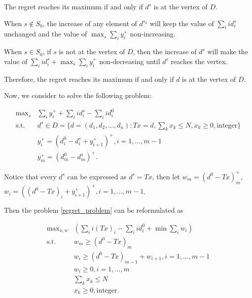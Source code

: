 \begin{thm}
  The regret reaches its maximum if and only if $d^{s}$ is at the vertex of $D$.
\end{thm}

When $s \notin S_0$, the increase of any element of $d^{s_0}$ will keep the value of $\sum_{i} i d^{s}_{i}$ unchanged and the value of $\max_{s} \sum_{i} y_{i}^{+}$ non-increasing.

When $s \in S_0$, if $s$ is not at the vertex of $D$, then the increase of $d^{s}$ will make the value of $\sum_{i} i d^{s}_{i} + \max_{s} \sum_{i} y_{i}^{+}$ non-decreasing until $d^{s}$ reaches the vertex.

Therefore, the regret reaches its maximum if and only if $d$ is at the vertex of $D$.

Now, we consider to solve the following problem:

\begin{equation}\label{regret_problem}
\begin{aligned}
  \mbox{max}_{s} & \sum_{i} y_{i}^{+} + \sum_{i} i d^{s}_{i} - \sum_{i} i d^{0}_{i} \\
  \mbox{s.t.} \quad & d^{s} \in D = \{d = (d_1,d_2,\ldots, d_n): Tx = d,\sum_{k} x_k \leq N, x_k \geq 0, \mbox{integer} \} \\
  & y_{i}^{+} = (d_{i}^{0} - d_{i}^{s} + y_{i+1}^{+})^{+}, i = 1, \ldots, m-1 \\
  & y_{m}^{+} = (d_{m}^{0} - d_{m}^{s})^{+}.
\end{aligned}
\end{equation}

Notice that every $d^{s}$ can be expressed as $d^{s} = Tx$, then let $w_{m} = (d^{0} - Tx)_{m}^{+}$, $w_{i} = ((d^{0} - Tx)_{i}+ y_{i+1}^{+})^{+}, i =1 ,\ldots, m-1$.
 
Then the problem \eqref{regret_problem} can be reformulated as 

\begin{equation}\label{regret_problem_1}
  \begin{aligned}
    \mbox{max}_{x,w} & (\sum_{i} i (Tx)_{i} - \sum_{i} i d^{0}_{i} + \min \sum_{i} w_{i}) \\
    \mbox{s.t.} \quad & w_m \geq (d^{0}- Tx)_{m} \\
    & w_{i} \geq (d^{0}- Tx)_{m-1} + w_{i+1}, i =1, \ldots,m-1 \\
    & w_i \geq 0, i =1, \ldots,m \\
    & \sum_{k} x_{k} \leq N \\
    & x_k \geq 0, \mbox{integer}.
  \end{aligned}
\end{equation}
  
